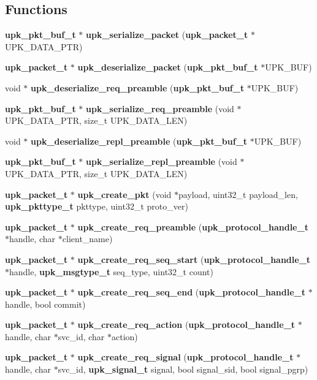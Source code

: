 \subsection*{Functions}
\begin{DoxyCompactItemize}
\item 
{\bf upk\_\-pkt\_\-buf\_\-t} $\ast$ {\bf upk\_\-serialize\_\-packet} ({\bf upk\_\-packet\_\-t} $\ast$UPK\_\-DATA\_\-PTR)
\item 
{\bf upk\_\-packet\_\-t} $\ast$ {\bf upk\_\-deserialize\_\-packet} ({\bf upk\_\-pkt\_\-buf\_\-t} $\ast$UPK\_\-BUF)
\item 
void $\ast$ {\bf upk\_\-deserialize\_\-req\_\-preamble} ({\bf upk\_\-pkt\_\-buf\_\-t} $\ast$UPK\_\-BUF)
\item 
{\bf upk\_\-pkt\_\-buf\_\-t} $\ast$ {\bf upk\_\-serialize\_\-req\_\-preamble} (void $\ast$UPK\_\-DATA\_\-PTR, size\_\-t UPK\_\-DATA\_\-LEN)
\item 
void $\ast$ {\bf upk\_\-deserialize\_\-repl\_\-preamble} ({\bf upk\_\-pkt\_\-buf\_\-t} $\ast$UPK\_\-BUF)
\item 
{\bf upk\_\-pkt\_\-buf\_\-t} $\ast$ {\bf upk\_\-serialize\_\-repl\_\-preamble} (void $\ast$UPK\_\-DATA\_\-PTR, size\_\-t UPK\_\-DATA\_\-LEN)
\item 
{\bf upk\_\-packet\_\-t} $\ast$ {\bf upk\_\-create\_\-pkt} (void $\ast$payload, uint32\_\-t payload\_\-len, {\bf upk\_\-pkttype\_\-t} pkttype, uint32\_\-t proto\_\-ver)
\item 
{\bf upk\_\-packet\_\-t} $\ast$ {\bf upk\_\-create\_\-req\_\-preamble} ({\bf upk\_\-protocol\_\-handle\_\-t} $\ast$handle, char $\ast$client\_\-name)
\item 
{\bf upk\_\-packet\_\-t} $\ast$ {\bf upk\_\-create\_\-req\_\-seq\_\-start} ({\bf upk\_\-protocol\_\-handle\_\-t} $\ast$handle, {\bf upk\_\-msgtype\_\-t} seq\_\-type, uint32\_\-t count)
\item 
{\bf upk\_\-packet\_\-t} $\ast$ {\bf upk\_\-create\_\-req\_\-seq\_\-end} ({\bf upk\_\-protocol\_\-handle\_\-t} $\ast$handle, bool commit)
\item 
{\bf upk\_\-packet\_\-t} $\ast$ {\bf upk\_\-create\_\-req\_\-action} ({\bf upk\_\-protocol\_\-handle\_\-t} $\ast$handle, char $\ast$svc\_\-id, char $\ast$action)
\item 
{\bf upk\_\-packet\_\-t} $\ast$ {\bf upk\_\-create\_\-req\_\-signal} ({\bf upk\_\-protocol\_\-handle\_\-t} $\ast$handle, char $\ast$svc\_\-id, {\bf upk\_\-signal\_\-t} signal, bool signal\_\-sid, bool signal\_\-pgrp)
\item 

\end{DoxyCompactItemize}
